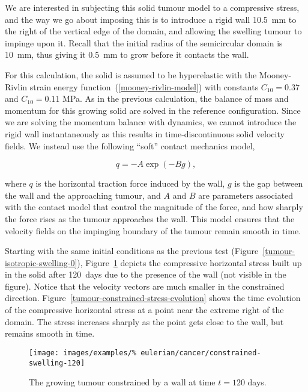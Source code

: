 We are interested in subjecting this solid tumour model to a
compressive stress, and the way we go about imposing this is to
introduce a rigid wall 10.5~mm to the right of the vertical edge
of the domain, and allowing the swelling tumour to impinge upon
it. Recall that the initial radius of the semicircular domain is
10~mm, thus giving it 0.5~mm to grow before it contacts the wall.

For this calculation, the solid is assumed to be hyperelastic with the
Mooney-Rivlin strain energy function~(\ref{mooney-rivlin-model}) with
constants $C_{10}=0.37$ and $C_{10}=0.11$ MPa. As in the previous
calculation, the balance of mass and momentum for this growing solid
are solved in the reference configuration. Since we are solving the
momentum balance with dynamics, we cannot introduce the rigid wall
instantaneously as this results in time-discontinuous solid velocity
fields. We instead use the following ``soft'' contact mechanics model,

\begin{equation}
q = - A \exp (-B g),
\end{equation}

\noindent where $q$ is the horizontal traction force induced by the
wall, $g$ is the gap between the wall and the approaching tumour, and
$A$ and $B$ are parameters associated with the contact model that
control the magnitude of the force, and how sharply the force rises as
the tumour approaches the wall. This model ensures that the velocity
fields on the impinging boundary of the tumour remain smooth in time.

Starting with the same initial conditions as the previous test
(Figure~\ref{tumour-isotropic-swelling-0}),
Figure~\ref{tumour-constrained-swelling-120} depicts the compressive
horizontal stress built up in the solid after 120~days due to the
presence of the wall (not visible in the figure). Notice that the
velocity vectors are much smaller in the constrained
direction. Figure~\ref{tumour-constrained-stress-evolution} shows the 
time evolution of the compressive horizontal stress at a point near
the extreme right of the domain. The stress increases sharply as the
point gets close to the wall, but remains smooth in time.

\begin{figure}[!hptb]
\centering
\texttt{[image: images/examples/\%
eulerian/cancer/constrained-swelling-120]}
\caption{The growing tumour constrained by a wall at time $t=120$ days.}
\label{tumour-constrained-swelling-120}
\end{figure}

